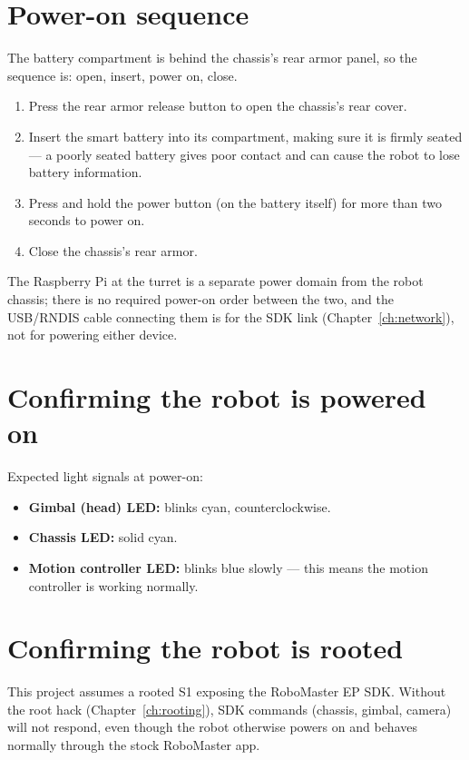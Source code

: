 \documentclass[11pt]{report}
\begin{document}
\section{Power-on sequence}

The battery compartment is behind the chassis's rear armor panel, so the
sequence is: open, insert, power on, close.

\begin{enumerate}
  \item Press the rear armor release button to open the chassis's rear
  cover.
  \item Insert the smart battery into its compartment, making sure it is
  firmly seated --- a poorly seated battery gives poor contact and can cause
  the robot to lose battery information.
  \item Press and hold the power button (on the battery itself) for more
  than two seconds to power on.
  \item Close the chassis's rear armor.
\end{enumerate}

The Raspberry Pi at the turret is a separate power domain from the robot
chassis; there is no required power-on order between the two, and the
USB/RNDIS cable connecting them is for the SDK link (Chapter~\ref{ch:network}),
not for powering either device.

\section{Confirming the robot is powered on}

Expected light signals at power-on:

\begin{itemize}
  \item \textbf{Gimbal (head) LED:} blinks cyan, counterclockwise.
  \item \textbf{Chassis LED:} solid cyan.
  \item \textbf{Motion controller LED:} blinks blue slowly --- this means
  the motion controller is working normally.
\end{itemize}

\section{Confirming the robot is rooted}

This project assumes a rooted S1 exposing the RoboMaster EP SDK. Without the
root hack (Chapter~\ref{ch:rooting}), SDK commands (chassis, gimbal, camera)
will not respond, even though the robot otherwise powers on and behaves
normally through the stock RoboMaster app.
\end{document}
